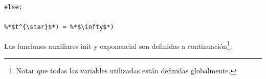 \documentclass[10pt,a4paper]{article} %
\begin{document}
\begin{lstlisting}[caption=Funciones auxiliares.]
                                                                                                                                                                                                                                                                                                                                                    else:
                                                                                                                                                                                                                                                                                                                                                                    %*$t^{\star}$*) = %*$\infty$*)
                                                                                                                                                                                                                                                                                                                                                                        \end{lstlisting}
                                                                                                                                                                                                                                                                                                                                                                        Las funciones auxiliares init y exponencial son definidas a continuaci\'on\footnote{Notar que todas las variables utilizadas est\'an
                                                                                                                                                                                                                                                                                                                                                                        definidas globalmente.}:
\end{document}
